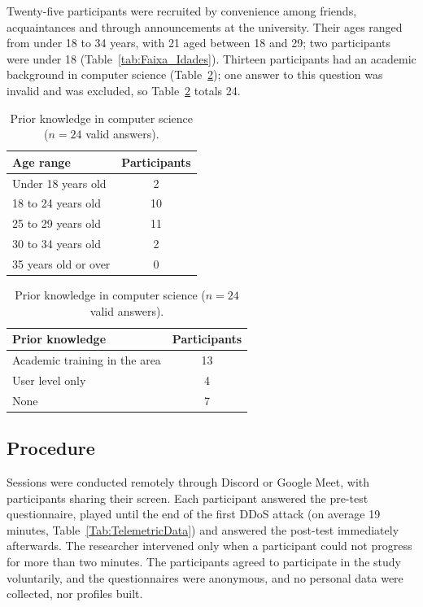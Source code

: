 \documentclass[runningheads]{llncs}
\begin{document}
Twenty-five participants were recruited by convenience among friends, acquaintances and through announcements at the university. Their ages ranged from under 18 to 34 years, with 21 aged between 18 and 29; two participants were under 18 (Table~\ref{tab:Faixa_Idades}). Thirteen participants had an academic background in computer science (Table~\ref{tab:Conhecimentos}); one answer to this question was invalid and was excluded, so Table~\ref{tab:Conhecimentos} totals 24.

\begin{table}[htbp]
    \centering
    \normalsize
    \renewcommand{\arraystretch}{1.2}
    \caption{Age range.}
    \label{tab:Faixa_Idades}
    \begin{tabular}{@{}lc@{}}
        \toprule
        \textbf{Age range} & \textbf{Participants} \\ \midrule
        Under 18 years old & 2 \\
        18 to 24 years old & 10 \\
        25 to 29 years old & 11 \\
        30 to 34 years old & 2 \\
        35 years old or over & 0 \\ \bottomrule
    \end{tabular}

    \vspace{1.5em}

    \caption{Prior knowledge in computer science ($n=24$ valid answers).}
    \label{tab:Conhecimentos}
    \begin{tabular}{@{}lc@{}}
        \toprule
        \textbf{Prior knowledge} & \textbf{Participants} \\ \midrule
        Academic training in the area & 13 \\
        User level only & 4 \\
        None & 7 \\ \bottomrule
    \end{tabular}
\end{table}

\subsection{Procedure}

Sessions were conducted remotely through Discord or Google Meet, with participants sharing their screen. Each participant answered the pre-test questionnaire, played until the end of the first DDoS attack (on average 19 minutes, Table~\ref{Tab:TelemetricData}) and answered the post-test immediately afterwards. The researcher intervened only when a participant could not progress for more than two minutes. The participants agreed to participate in the study voluntarily, and the questionnaires were anonymous, and no personal data were collected, nor profiles built.
\end{document}
